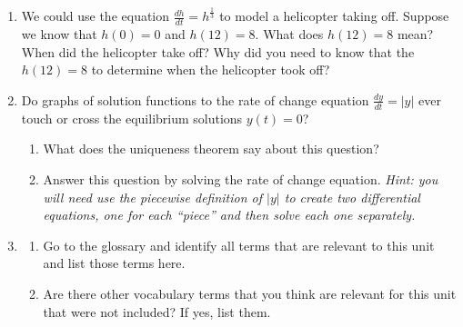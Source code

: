 \begin{enumerate}
\item We could use the equation $\displaystyle\frac{dh}{dt} = h^{\frac{1}{3}}$ to model a helicopter taking off. Suppose we know that $h(0)=0$ and $h(12)=8$. What does $h(12)=8$ mean? When did the helicopter take off? Why did you need to know that the $h(12)=8$ to determine when the helicopter took off? \label{05HWproblem6}

\item Do graphs of solution functions to the rate of change equation $\displaystyle\frac{dy}{dt}=|y|$ ever touch or cross the equilibrium solutions $y(t)=0$?
\begin{enumerate}
\item What does the uniqueness theorem say about this question?
\item Answer this question by solving the rate of change equation. \textsl{Hint: you will need use the piecewise definition of $|y|$ to create two differential equations, one for each ``piece'' and then solve each one separately.} \label{05HWproblem7}
\end{enumerate}

\item \label{05HWproblem8}
\begin{enumerate}
\item Go to the glossary and identify all terms that are relevant to this unit and list those terms here.
\item Are there other vocabulary terms that you think are relevant for this unit that were not included? If yes, list them.
\end{enumerate}

\end{enumerate}





